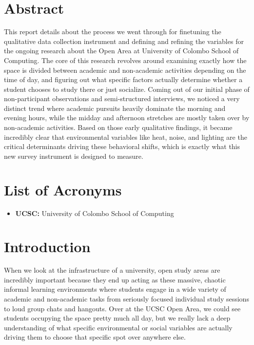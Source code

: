 \documentclass[12pt, a4paper]{report}
\begin{document}
\chapter*{Abstract}
This report details about the process we went through for finetuning the qualitative data collection instrument and defining and refining the variables for the ongoing research about the Open Area at University of Colombo School of Computing. The core of this research revolves around examining exactly how the space is divided between academic and non-academic activities depending on the time of day, and figuring out what specific factors actually determine whether a student chooses to study there or just socialize. Coming out of our initial phase of non-participant observations and semi-structured interviews, we noticed a very distinct trend where academic pursuits heavily dominate the morning and evening hours, while the midday and afternoon stretches are mostly taken over by non-academic activities. Based on those early qualitative findings, it became incredibly clear that environmental variables like heat, noise, and lighting are the critical determinants driving these behavioral shifts, which is exactly what this new survey instrument is designed to measure.


\tableofcontents
\clearpage

\listoftables
{}
\clearpage

\chapter*{List of Acronyms}
\begin{itemize}
    \item \textbf{UCSC:} University of Colombo School of Computing
\end{itemize}
\clearpage


\chapter{Introduction}
When we look at the infrastructure of a university, open study areas are incredibly important because they end up acting as these massive, chaotic informal learning environments where students engage in a wide variety of academic and non-academic tasks from seriously focused individual study sessions to loud group chats and hangouts. Over at the UCSC Open Area, we could see students occupying the space pretty much all day, but we really lack a deep understanding of what specific environmental or social variables are actually driving them to choose that specific spot over anywhere else. 
\end{document}
